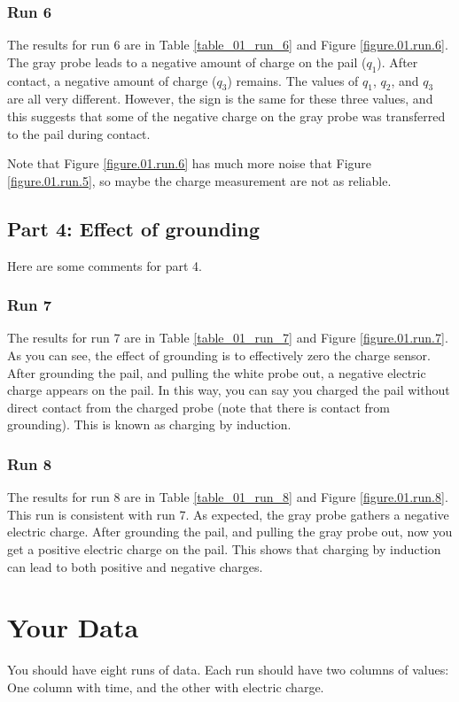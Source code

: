 \subsubsection{Run 6}
%
The results for run 6 are in Table \ref{table_01_run_6} and Figure \ref{figure.01.run.6}. The gray probe leads to a negative amount of charge on the pail ($q_{1}$). After contact, a negative amount of charge ($q_{3}$) remains. The values of $q_{1}$, $q_{2}$, and $q_{3}$ are all very different. However, the sign is the same for these three values, and this suggests that some of the negative charge on the gray probe was transferred to the pail during contact.

Note that Figure \ref{figure.01.run.6} has much more noise that Figure \ref{figure.01.run.5}, so maybe the charge measurement are not as reliable.
%
\subsection{Part 4: Effect of grounding}
%
Here are some comments for part 4.
%
\subsubsection{Run 7}
%
The results for run 7 are in Table \ref{table_01_run_7} and Figure \ref{figure.01.run.7}. As you can see, the effect of grounding is to effectively zero the charge sensor. After grounding the pail, and pulling the white probe out, a negative electric charge appears on the pail. In this way, you can say you charged the pail without direct contact from the charged probe (note that there is contact from grounding). This is known as charging by induction.
%
\subsubsection{Run 8}
%
The results for run 8 are in Table \ref{table_01_run_8} and Figure \ref{figure.01.run.8}. This run is consistent with run 7. As expected, the gray probe gathers a negative electric charge. After grounding the pail, and pulling the gray probe out, now you get a positive electric charge on the pail. This shows that charging by induction can lead to both positive and negative charges.
%
\section{Your Data}
%
You should have eight runs of data. Each run should have two columns of values: One column with time, and the other with electric charge.
%
\newpage
